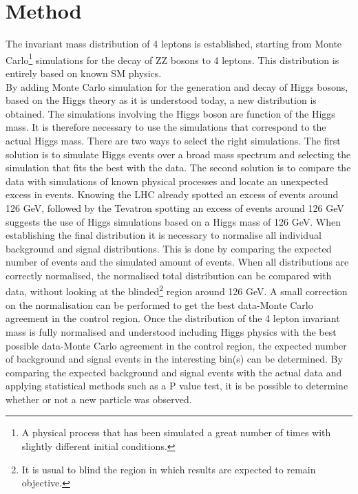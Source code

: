 \documentclass[a4paper,12pt]{article}
\begin{document}
\section{Method}
The invariant mass distribution of 4 leptons is established, starting from Monte Carlo\footnote{A physical process that has been simulated a great number of times with slightly different initial conditions.} simulations for the decay of ZZ bosons to 4 leptons. This distribution is entirely based on known SM physics. 
\\By adding Monte Carlo simulation for the generation and decay of Higgs bosons, based on the Higgs theory as it is understood today, a new distribution is obtained. The simulations involving the Higgs boson are function of the Higgs mass. It is therefore necessary to use the simulations that correspond to the actual Higgs mass. There are two ways to select the right simulations. The first solution is to simulate Higgs events over a broad mass spectrum and selecting the simulation that fits the best with the data. The second solution is to compare the data with simulations of known physical processes and locate an unexpected excess in events. Knowing the LHC already spotted an excess of events around 126 GeV, followed by the Tevatron spotting an excess of events around 126 GeV suggests the use of Higgs simulations based on a Higgs mass of 126 GeV. When establishing the final distribution it is necessary to normalise all individual background and signal distributions. This is done by comparing the expected number of events and the simulated amount of events. When all distributions are correctly normalised, the normalised total distribution can be compared with data, without looking at the blinded\footnote{It is usual to blind the region in which results are expected to remain objective.} region around 126 GeV. A small correction on the normalisation can be performed to get the best data-Monte Carlo agreement in the control region. Once the distribution of the 4 lepton invariant mass is fully normalised and understood including Higgs physics with the best possible data-Monte Carlo agreement in the control region, the expected number of background and signal events in the interesting bin(s) can be determined. By comparing the expected background and signal events with the actual data and applying statistical methods such as a P value test, it is be possible to determine whether or not a new particle was observed.
\newpage




\end{document}
